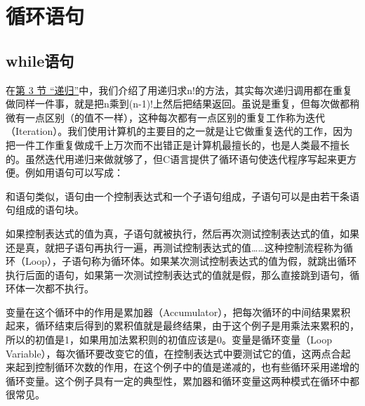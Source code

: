 

\chapter{循环语句}
%





\section{while语句}
%
在\hyperlink{db.ch05s03.id2722951}{第 3 节 “递归”}中，我们介绍了用递归求n!的方法，其实每次递归调用都在重复做同样一件事，就是把n乘到(n-1)!上然后把结果返回。虽说是重复，但每次做都稍微有一点区别（的值不一样），这种每次都有一点区别的重复工作称为迭代（Iteration）。我们使用计算机的主要目的之一就是让它做重复迭代的工作，因为把一件工作重复做成千上万次而不出错正是计算机最擅长的，也是人类最不擅长的。虽然迭代用递归来做就够了，但C语言提供了循环语句使迭代程序写起来更方便。例如用语句可以写成：




和语句类似，语句由一个控制表达式和一个子语句组成，子语句可以是由若干条语句组成的语句块。


\begin{BookLiteral}
\end{BookLiteral}


如果控制表达式的值为真，子语句就被执行，然后再次测试控制表达式的值，如果还是真，就把子语句再执行一遍，再测试控制表达式的值……这种控制流程称为循环（Loop），子语句称为循环体。如果某次测试控制表达式的值为假，就跳出循环执行后面的语句，如果第一次测试控制表达式的值就是假，那么直接跳到语句，循环体一次都不执行。



变量在这个循环中的作用是累加器（Accumulator），把每次循环的中间结果累积起来，循环结束后得到的累积值就是最终结果，由于这个例子是用乘法来累积的，所以的初值是1，如果用加法累积则的初值应该是0。变量是循环变量（Loop Variable），每次循环要改变它的值，在控制表达式中要测试它的值，这两点合起来起到控制循环次数的作用，在这个例子中的值是递减的，也有些循环采用递增的循环变量。这个例子具有一定的典型性，累加器和循环变量这两种模式在循环中都很常见。



